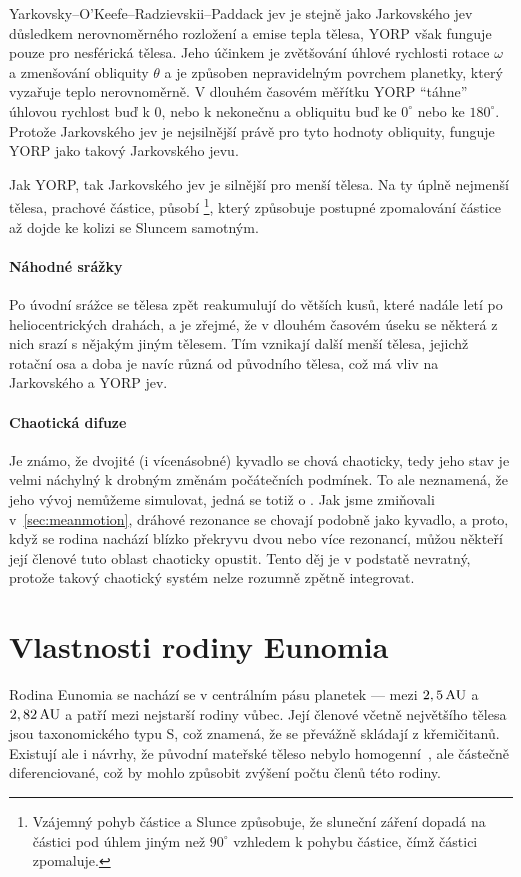 \documentclass[A4paper, 12pt, oneside]{book}
\begin{document}
Yarkovsky–O'Keefe–Radzievskii–Paddack jev je stejně jako Jarkovského jev důsledkem nerovnoměrného rozložení a emise tepla tělesa, YORP však funguje pouze pro nesférická tělesa. Jeho účinkem je zvětšování úhlové rychlosti rotace $\omega$ a zmenšování obliquity $\theta$ a je způsoben nepravidelným povrchem planetky, který vyzařuje teplo nerovnoměrně. V dlouhém časovém měřítku YORP \enquote{táhne} úhlovou rychlost buď k $0$, nebo k nekonečnu a obliquitu buď ke $0^\circ$ nebo ke $180^\circ$. Protože Jarkovského jev je nejsilnější právě pro tyto hodnoty obliquity, funguje YORP jako takový  Jarkovského jevu. 

Jak YORP, tak Jarkovského jev je silnější pro menší tělesa. Na ty úplně nejmenší tělesa, prachové částice, působí \footnote{Vzájemný pohyb částice a Slunce způsobuje, že sluneční záření dopadá na částici pod úhlem jiným než $90^\circ$ vzhledem k pohybu částice, čímž částici zpomaluje.}, který způsobuje postupné zpomalování částice až dojde ke kolizi se Sluncem samotným. 

\subsubsection{Náhodné srážky}
Po úvodní srážce se tělesa zpět reakumulují do větších kusů, které nadále letí po heliocentrických drahách, a je zřejmé, že v dlouhém časovém úseku se některá z nich srazí s nějakým jiným tělesem. Tím vznikají další menší tělesa, jejichž rotační osa a doba je navíc různá od původního tělesa, což má vliv na Jarkovského a YORP jev. 

\subsubsection{Chaotická difuze}
Je známo, že dvojité (i vícenásobné) kyvadlo se chová chaoticky, tedy jeho stav je velmi náchylný k drobným změnám počátečních podmínek. To ale neznamená, že jeho vývoj nemůžeme simulovat, jedná se totiž o . Jak jsme zmiňovali v~\ref{sec:meanmotion}, dráhové rezonance se chovají podobně jako kyvadlo, a proto, když se rodina nachází blízko překryvu dvou nebo více rezonancí, můžou někteří její členové tuto oblast chaoticky opustit. Tento děj je v podstatě nevratný, protože takový chaotický systém nelze rozumně zpětně integrovat.

\chapter{Vlastnosti rodiny Eunomia} \label{ch:eunomia}
Rodina Eunomia se nachází se v centrálním pásu planetek --- mezi $2,5\,{\rm AU}$ a $2,82\,{\rm AU}$ a patří mezi nejstarší rodiny vůbec. Její členové včetně největšího tělesa jsou taxonomického typu S, což znamená, že se převážně skládají z křemičitanů. Existují ale i návrhy, že původní mateřské těleso nebylo homogenní~\cite{nathues05}, ale částečně diferenciované, což by mohlo způsobit zvýšení počtu členů této rodiny.
\end{document}
